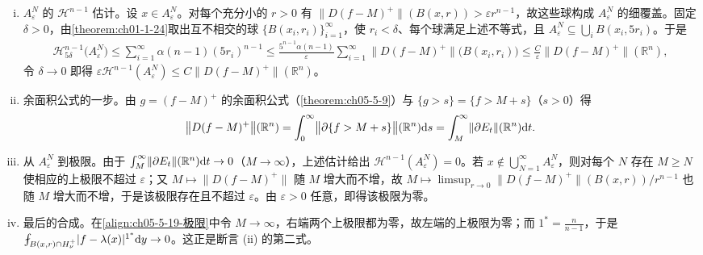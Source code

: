 \documentclass[../../main.tex]{subfiles}%
\begin{document}
\begin{remark}
\begin{enumerate}[(i)]
\item $A_\varepsilon^N$ 的 $\mathcal{H}^{n-1}$ 估计。设 $x\in A_\varepsilon^N$。对每个充分小的 $r>0$ 有 $\lVert D(f-M)^{+}\rVert(B(x,r))>\varepsilon r^{n-1}$，故这些球构成 $A_\varepsilon^N$ 的细覆盖。固定 $\delta>0$，由\cref{theorem:ch01-1-24}取出互不相交的球 $\{B(x_i,r_i)\}_{i=1}^{\infty}$，使 $r_i<\delta$、每个球满足上述不等式，且 $A_\varepsilon^N\subseteq\bigcup_{i}B(x_i,5r_i)$。于是%
\begin{align*}
\mathcal{H}^{n-1}_{5\delta}\bigl(A_\varepsilon^N\bigr)\leqslant\sum_{i=1}^{\infty}\alpha(n-1)(5r_i)^{n-1}
\leqslant\frac{5^{n-1}\alpha(n-1)}{\varepsilon}\sum_{i=1}^{\infty}\bigl\lVert D(f-M)^{+}\bigr\rVert\bigl(B(x_i,r_i)\bigr)
\leqslant\frac{C}{\varepsilon}\bigl\lVert D(f-M)^{+}\bigr\rVert(\mathbb{R}^n),
\end{align*}
令 $\delta\to0$ 即得 $\varepsilon\mathcal{H}^{n-1}(A_\varepsilon^N)\leqslant C\lVert D(f-M)^{+}\rVert(\mathbb{R}^n)$。
\item 余面积公式的一步。由 $g=(f-M)^{+}$ 的余面积公式（\cref{theorem:ch05-5-9}）与 $\{g>s\}=\{f>M+s\}$（$s>0$）得%
\begin{align*}
\bigl\lVert D(f-M)^{+}\bigr\rVert(\mathbb{R}^n)=\int_0^{\infty}\bigl\lVert\partial\{f>M+s\}\bigr\rVert(\mathbb{R}^n)\mathrm{d} s=\int_M^{\infty}\lVert\partial E_t\rVert(\mathbb{R}^n)\mathrm{d} t .
\end{align*}
\item 从 $A_\varepsilon^N$ 到极限。由于 $\int_M^{\infty}\lVert\partial E_t\rVert(\mathbb{R}^n)\mathrm{d} t\to0$（$M\to\infty$），上述估计给出 $\mathcal{H}^{n-1}(A_\varepsilon^N)=0$。若 $x\notin\bigcup_{N=1}^{\infty}A_\varepsilon^N$，则对每个 $N$ 存在 $M\geqslant N$ 使相应的上极限不超过 $\varepsilon$；又 $M\mapsto\bigl\lVert D(f-M)^{+}\bigr\rVert$ 随 $M$ 增大而不增，故 $M\mapsto\limsup_{r\to0}\lVert D(f-M)^{+}\rVert(B(x,r))/r^{n-1}$ 也随 $M$ 增大而不增，于是该极限存在且不超过 $\varepsilon$。由 $\varepsilon>0$ 任意，即得该极限为零。
\item 最后的合成。在\eqref{align:ch05-5-19-极限}中令 $M\to\infty$，右端两个上极限都为零，故左端的上极限为零；而 $1^{*}=\frac{n}{n-1}$，于是 $\fint_{B(x,r)\cap H_\nu^+}\lvert f-\lambda(x)\rvert^{1^{*}}\diff y\to0$。这正是断言 (ii) 的第二式。
\end{enumerate}
\end{remark}
\end{document}
